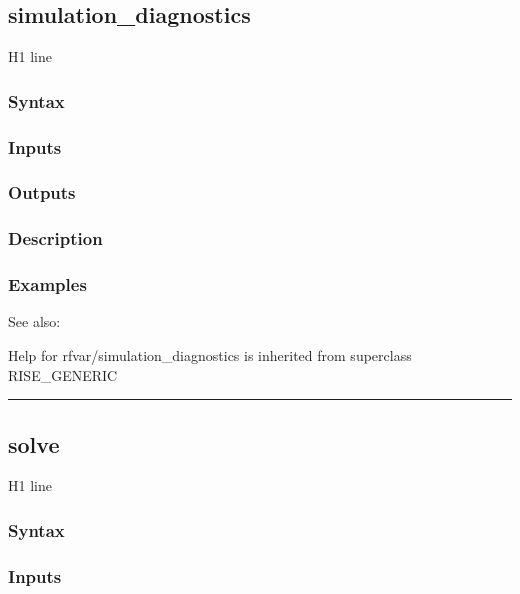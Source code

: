 \documentclass[letterpaper,10pt,english]{sphinxmanual}
\begin{document}
\subsection{simulation\_diagnostics}
\label{classes/models/@rfvar/rfvar:id127}\label{classes/models/@rfvar/rfvar:simulation-diagnostics}
H1 line


\subsubsection{Syntax}
\label{classes/models/@rfvar/rfvar:id128}

\subsubsection{Inputs}
\label{classes/models/@rfvar/rfvar:id129}

\subsubsection{Outputs}
\label{classes/models/@rfvar/rfvar:id130}

\subsubsection{Description}
\label{classes/models/@rfvar/rfvar:id131}

\subsubsection{Examples}
\label{classes/models/@rfvar/rfvar:id132}
See also:

Help for rfvar/simulation\_diagnostics is inherited from superclass RISE\_GENERIC


\bigskip\hrule{}\bigskip



\subsection{solve}
\label{classes/models/@rfvar/rfvar:id133}\label{classes/models/@rfvar/rfvar:solve}
H1 line


\subsubsection{Syntax}
\label{classes/models/@rfvar/rfvar:id134}

\subsubsection{Inputs}
\label{classes/models/@rfvar/rfvar:id135}
\end{document}
